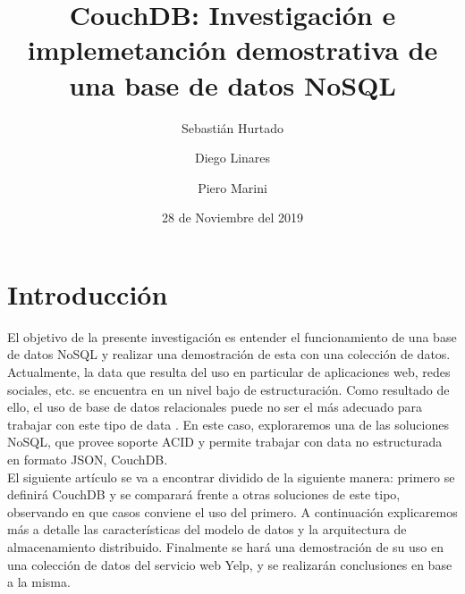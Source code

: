 \documentclass{article}
\title{CouchDB: Investigación e implemetanción demostrativa de una base de datos NoSQL}
\author{Sebastián Hurtado \and Diego Linares \and Piero Marini}
\date{28 de Noviembre del 2019}
\begin{document}
    \maketitle  
    \section{Introducción}
        El objetivo de la presente investigación es entender el funcionamiento de una base de datos NoSQL y realizar una demostración de esta con una colección de datos. Actualmente, la data que resulta del uso en particular de aplicaciones web, redes sociales, etc. se encuentra en un nivel bajo de estructuración. Como resultado de ello, el uso de base de datos relacionales puede no ser el más adecuado para trabajar con este tipo de data \cite{sangeeta}. En este caso, exploraremos una de las soluciones NoSQL, que provee soporte ACID y permite trabajar con data no estructurada en formato JSON, CouchDB. \\
        El siguiente artículo se va a encontrar dividido de la siguiente manera: primero se definirá CouchDB y se comparará frente a otras soluciones de este tipo, observando en que casos conviene el uso del primero. A continuación explicaremos más a detalle las características del modelo de datos y la arquitectura de almacenamiento distribuido. Finalmente se hará una demostración de su uso en una colección de datos del servicio web Yelp, y se realizarán conclusiones en base a la misma. 
\end{document}
